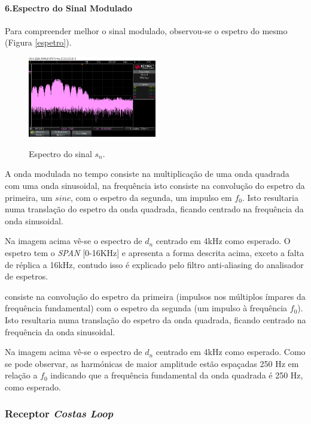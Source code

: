 \documentclass[11pt]{article}
\numberwithin{equation}{section}
\begin{document}
\paragraph{6.Espectro do Sinal Modulado} \hspace{0pt}
\label{para:P2-6}

Para compreender melhor o sinal modulado, observou-se o espetro do mesmo (Figura \ref{espetro}).
\begin{figure}[H]
	\centering
	\includegraphics[width=0.5\textwidth]{./spectrum_sn_0-16k}~\\
	\caption{Espectro do sinal $s_n$.}
	\label{espetrosn}
\end{figure}

A onda modulada no tempo consiste na multiplicação de uma onda quadrada com uma onda sinusoidal, na frequência isto consiste na convolução do espetro da primeira, um $sinc$, com o espetro da segunda, um impulso em $f_0$. Isto resultaria numa translação do espetro da onda quadrada, ficando centrado na frequência da onda sinusoidal.

Na imagem acima vê-se o espectro de $d_n$ centrado em 4kHz como esperado. O espetro tem o \textit{SPAN} [0-16KHz] e apresenta a forma descrita acima, exceto a falta de réplica a 16kHz, contudo isso é explicado pelo filtro anti-aliasing do analisador de espetros.

consiste na convolução do espetro da primeira (impulsos nos múltiplos ímpares da frequência fundamental) com o espetro da segunda (um impulso à frequência $f_0$). Isto resultaria numa translação do espetro da onda quadrada, ficando centrado na frequência da onda sinusoidal.

Na imagem acima vê-se o espectro de $d_n$ centrado em 4kHz como esperado. Como se pode observar, as harmónicas de maior amplitude estão espaçadas 250 Hz em relação a $f_0$ indicando que a frequência fundamental da onda quadrada é 250 Hz, como esperado.

\subsubsection{Receptor \textit{Costas Loop}}
\end{document}
